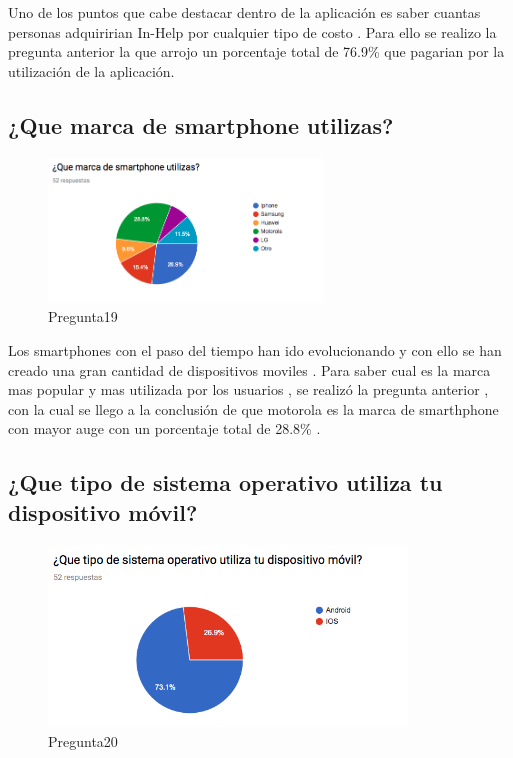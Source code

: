 Uno de los puntos que cabe destacar dentro de la aplicación es saber cuantas personas adquiririan In-Help por cualquier tipo de costo . Para ello se realizo la pregunta anterior la que arrojo un porcentaje total de 76.9\% que pagarian por la utilización de la aplicación.

\subsection{¿Que marca de smartphone utilizas?}

\begin{figure}[htbp!]
	\begin{center}
		\includegraphics[width=0.65\textwidth]{DisenoEstructura/imagenes/Pregunta19}
		\caption{Pregunta19}
		\label{DE/FO/Pregunta19}
	\end{center}
\end{figure}

Los smartphones con el paso del tiempo han ido evolucionando y con ello se han creado una gran cantidad de dispositivos moviles . Para saber cual es la marca mas popular y mas utilizada por los usuarios , se realizó la pregunta anterior , con la cual se llego a la conclusión de que motorola es la marca de smarthphone con mayor auge con un porcentaje total de 28.8\% . \\

\subsection{¿Que tipo de sistema operativo utiliza tu dispositivo móvil?}

\begin{figure}[htbp!]
	\begin{center}
		\includegraphics[width=0.85\textwidth]{DisenoEstructura/imagenes/Pregunta20}
		\caption{Pregunta20}
		\label{DE/FO/Pregunta20}
	\end{center}
\end{figure}

